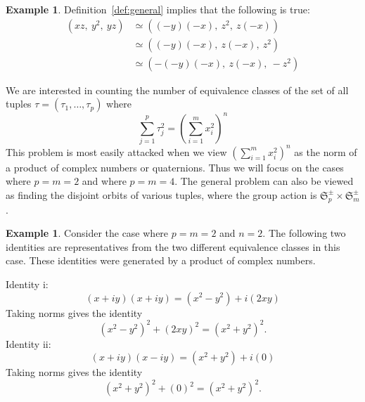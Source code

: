 \documentclass[12pt]{article}
\theoremstyle{definition}
\newtheorem{example}[theorem]{Example}
\theoremstyle{remark}
\newcommand{\Zzz}{\mathbb Z}
\numberwithin{equation}{section}
\begin{document}
\begin{example}
Definition~\ref{def:general} implies that the following is true:
\begin{align*}
( xz,\: y^2,\: yz )  
&\simeq ( (-y)(-x),\: z^2,\: z(-x) ) \\
&\simeq ( (-y)(-x),\: z(-x),\: z^2 ) \\
&\simeq ( -(-y)(-x),\: z(-x),\: -z^2 ) 
\end{align*}
\end{example}



We are interested in counting the number of
equivalence classes of the set of all tuples
 \( \tau = ( \tau_1, \ldots, \tau_p) \)
where
\[
\sum_{j = 1}^{p}  \tau_j ^ 2  
= 
\left( \sum_{i = 1}^{m}  x_i ^ 2  \right) ^ n 
\] 
This problem is most easily attacked when we
view \( \left( \sum_{i = 1}^{m}  x_i ^ 2  \right) ^ n \)
as the norm of a product of complex numbers or quaternions.
Thus we will focus on the cases where \( p = m = 2 \) and where \( p = m = 4 \).
The general problem can also be viewed as finding the disjoint orbits of 
various tuples, where the group action is \( \mathfrak{S}_p^\pm \times \mathfrak{S}_m^\pm \).



\begin{example}

Consider the case where \( p = m = 2 \) and \( n = 2\).
The following two identities are representatives from 
the two different equivalence classes in this case. These identities
were generated by a product of complex numbers. 

\noindent
Identity i:
\begin{equation*}
(x + iy)(x + iy) = (x^2 - y^2 ) + i(2xy) 
\end{equation*}
Taking norms gives the identity
\begin{equation}
    (x^2 - y^2 )^2 + (2xy)^2 
    = (x^2 + y^2)^2.
\end{equation}
Identity ii:
\begin{equation*}
    (x + iy )(x - iy )
    = (x^2 + y^2 ) + i(0)  
\end{equation*}
Taking norms gives the identity
\begin{equation}
    (x^2 + y^2 )^2 + (0)^2
    = (x^2 + y^2 )^2.
\end{equation}
\end{example}
\end{document}
